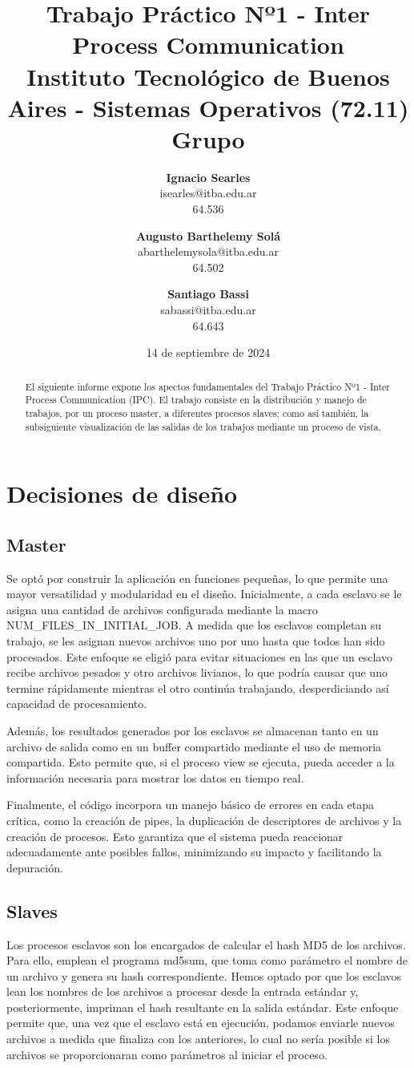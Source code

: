 \documentclass{article}
\title{\textbf{Trabajo Práctico Nº1 - Inter Process Communication} \\ [1ex]
\large Instituto Tecnológico de Buenos Aires - Sistemas Operativos (72.11) \\ [1ex]
\large Grupo  }
\date{14 de septiembre de 2024}
\author{
\textbf{Ignacio Searles}\\
isearles@itba.edu.ar\\
64.536
\and
\textbf{Augusto Barthelemy Solá}\\
abarthelemysola@itba.edu.ar\\
64.502
\and
\textbf{Santiago Bassi}\\
sabassi@itba.edu.ar\\
64.643
}
\begin{document}
\maketitle

\begin{abstract}
El siguiente informe expone los apectos fundamentales del Trabajo Práctico Nº1 - Inter Process Communication (IPC). El trabajo consiste en la distribución y manejo de trabajos, por un proceso master, a diferentes procesos slaves; como así también, la subsiguiente visualización de las salidas de los trabajos mediante un proceso de vista.
\end{abstract}

\section{Decisiones de diseño}

\subsection{Master}
Se optó por construir la aplicación en funciones pequeñas, lo que permite una mayor versatilidad y modularidad en el diseño. Inicialmente, a cada esclavo se le asigna una cantidad de archivos configurada mediante la macro NUM\_FILES\_IN\_INITIAL\_JOB. A medida que los esclavos completan su trabajo, se les asignan nuevos archivos uno por uno hasta que todos han sido procesados. Este enfoque se eligió para evitar situaciones en las que un esclavo recibe archivos pesados y otro archivos livianos, lo que podría causar que uno termine rápidamente mientras el otro continúa trabajando, desperdiciando así capacidad de procesamiento.

Además, los resultados generados por los esclavos se almacenan tanto en un archivo de salida como en un buffer compartido mediante el uso de memoria compartida. Esto permite que, si el proceso view se ejecuta, pueda acceder a la información necesaria para mostrar los datos en tiempo real.

Finalmente, el código incorpora un manejo básico de errores en cada etapa crítica, como la creación de pipes, la duplicación de descriptores de archivos y la creación de procesos. Esto garantiza que el sistema pueda reaccionar adecuadamente ante posibles fallos, minimizando su impacto y facilitando la depuración.

\subsection{Slaves}
Los procesos esclavos son los encargados de calcular el hash MD5 de los archivos. Para ello, emplean el programa md5sum, que toma como parámetro el nombre de un archivo y genera su hash correspondiente. Hemos optado por que los esclavos lean los nombres de los archivos a procesar desde la entrada estándar y, posteriormente, impriman el hash resultante en la salida estándar. Este enfoque permite que, una vez que el esclavo está en ejecución, podamos enviarle nuevos archivos a medida que finaliza con los anteriores, lo cual no sería posible si los archivos se proporcionaran como parámetros al iniciar el proceso.
\end{document}

